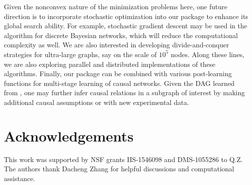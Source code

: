 \documentclass[article]{jss}
\renewcommand{\|}{\,|\,}
\begin{document}
Given the nonconvex nature of the minimization problems here, one future direction is to incorporate stochastic optimization into our package to enhance its global search ability. For example, stochastic gradient descent may be used in the algorithm for discrete Bayesian networks, which will reduce the computational complexity as well. We are also interested in developing divide-and-conquer strategies for ultra-large graphs, say on the scale of $10^5$ nodes. Along these lines, we are also exploring parallel and distributed implementations of these algorithms. Finally, our package can be combined with various post-learning functions for multi-stage learning of causal networks. Given the DAG learned from , one may further infer causal relations in a subgraph of interest by making additional causal assumptions or with new experimental data.

\section*{Acknowledgements} 

This work was supported by NSF grants IIS-1546098 and DMS-1055286 to Q.Z. The authors thank Dacheng Zhang for helpful discussions and computational assistance.



\end{document}
